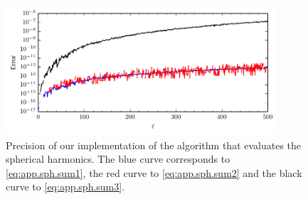 \begin{figure}
 \centering
 \includegraphics[width=0.9\textwidth]{figs/backmatter/SphPrecision.pdf}
 \caption[Precision of our implementation of the algorithm that evaluates the spherical harmonics]
	  {Precision of our implementation of the algorithm that evaluates the spherical harmonics. 
	  The {\color{blue} blue} curve corresponds to \eqref{eq:app.sph.sum1}, the 
	  {\color{red} red} curve to \eqref{eq:app.sph.sum2} and the black curve to 
	  \eqref{eq:app.sph.sum3}.}
 \label{fig:app.sph.precision}
\end{figure}